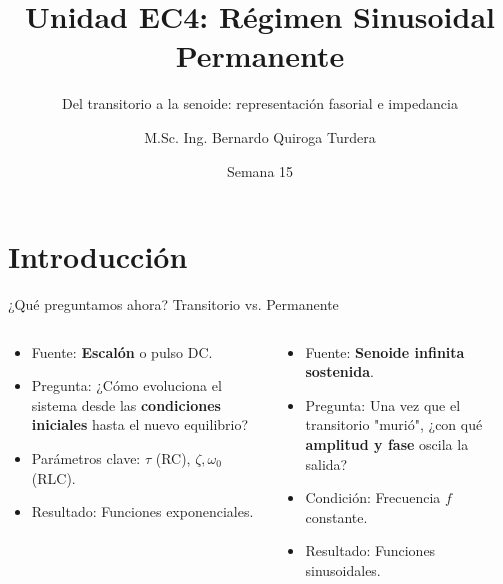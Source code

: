 \documentclass[aspectratio=169, 10pt]{beamer}
\title[Fasores e Impedancias]{Unidad EC4: Régimen Sinusoidal Permanente}
\subtitle{Del transitorio a la senoide: representación fasorial e impedancia}
\author[B. Quiroga Turdera]{M.Sc. Ing. Bernardo Quiroga Turdera}
\institute[UCB Tarija]{Universidad Católica Boliviana ``San Pablo'' --- Sede Tarija}
\date{Semana 15}
\begin{document}
\begin{frame}
    \titlepage
\end{frame}

\section{Introducción}
\begin{frame}{¿Qué preguntamos ahora? Transitorio vs. Permanente}
    \begin{columns}[T]
        \begin{tcolorbox}[colback=white, colframe=ucbblue, title=\textbf{Unidad EC3: Transitorio}]
            \begin{itemize}
                \item Fuente: \textbf{Escalón} o pulso DC.
                \item Pregunta: ¿Cómo evoluciona el sistema desde las \textbf{condiciones iniciales} hasta el nuevo equilibrio?
                \item Parámetros clave: $\tau$ (RC), $\zeta, \omega_0$ (RLC).
                \item Resultado: Funciones exponenciales.
            \end{itemize}
        \end{tcolorbox}
        
        \begin{tcolorbox}[colback=white, colframe=ucbblue, title=\textbf{Unidad EC4: Permanente AC}]
            \begin{itemize}
                \item Fuente: \textbf{Senoide infinita sostenida}.
                \item Pregunta: Una vez que el transitorio "murió", ¿con qué \textbf{amplitud y fase} oscila la salida?
                \item Condición: Frecuencia $f$ constante.
                \item Resultado: Funciones sinusoidales.
            \end{itemize}
        \end{tcolorbox}
    \end{columns}
\end{frame}
\end{document}

